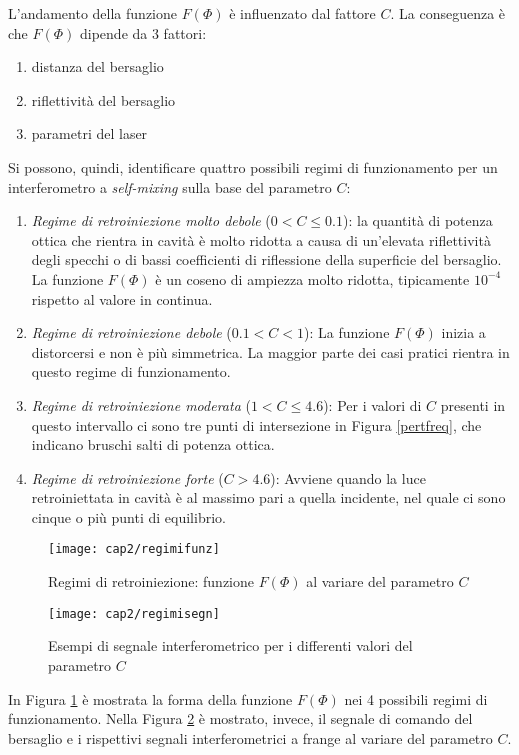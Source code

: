 L'andamento della funzione $F(\Phi)$ è influenzato dal fattore $C$. La conseguenza è che $F(\Phi)$  dipende da 3 fattori:
\begin{enumerate}
	\item distanza del bersaglio
	\item riflettività del bersaglio 
	\item parametri del laser
\end{enumerate}
Si possono, quindi, identificare quattro possibili regimi di funzionamento per un interferometro a \textit{self-mixing} sulla base del parametro $C$:
\begin{enumerate}
	\item \textit{Regime di retroiniezione molto debole} ($0 < C \leq 0.1$): la quantità di potenza ottica che rientra in cavità è molto ridotta a causa di un'elevata riflettività degli specchi o di bassi coefficienti di riflessione della superficie del bersaglio. La funzione $F(\Phi)$ è un coseno di ampiezza molto ridotta, tipicamente $10^{-4}$ rispetto al valore in continua.
	\item \textit{Regime di retroiniezione debole} ($0.1 < C < 1$): La funzione $F(\Phi)$ inizia a distorcersi e non è più simmetrica. La maggior parte dei casi pratici rientra in questo regime di funzionamento. 
	\item \textit{Regime di retroiniezione moderata} ($1 < C \leq 4.6$): Per i valori di $C$ presenti in questo intervallo ci sono tre punti di intersezione in Figura \ref{pertfreq}, che indicano bruschi salti di potenza ottica.
	\item \textit{Regime di retroiniezione forte} ($C>4.6$): Avviene quando la luce retroiniettata in cavità è al massimo pari a quella incidente, nel quale ci sono cinque o più punti di equilibrio.
\end{enumerate}
\begin{figure}  
  \begin{center}
    \texttt{[image: cap2/regimifunz]}
    \caption{Regimi di retroiniezione: funzione $F(\Phi)$ al variare del parametro $C$}
    \label{regimifunz}
  \end{center}
\end{figure}
\begin{figure}  
  \begin{center}
    \texttt{[image: cap2/regimisegn]}
    \caption{Esempi di segnale interferometrico per i differenti valori del parametro $C$}
    \label{regimisegn}
  \end{center}
\end{figure}
In Figura \ref{regimifunz} è mostrata la forma della funzione $F(\Phi)$ nei 4 possibili regimi di funzionamento. Nella Figura \ref{regimisegn} è mostrato, invece, il segnale di comando del bersaglio e i rispettivi segnali interferometrici a frange al variare del parametro $C$.

